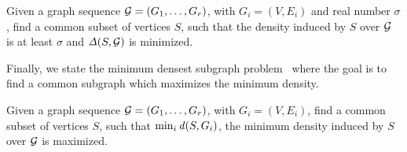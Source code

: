 \begin{problem}
\label{pr:diff}
Given a graph sequence ${\mathcal G} = (G_1,\dots,G_r)$, with  $G_i = (V, E_i)$ and real number $\sigma$, find a common subset of vertices $S$, 
such that the density induced by $S$  over  ${\mathcal G}$  is at least $\sigma$ and $\diff{S, \calG}$ is minimized.
\end{problem}

Finally, we state the minimum densest subgraph problem~\cite{jethava2015finding} where the goal is to find a common subgraph which maximizes the minimum density.

\begin{problem}
\label{pr:dcs}
Given a graph sequence ${\mathcal G} = (G_1,\dots,G_r)$, with  $G_i = (V, E_i)$, find a common subset of vertices
$S$, 
such that $\min_i \dens{S, G_i}$, the minimum density induced by  $S$  over  ${\mathcal G}$  is maximized.
\end{problem}
